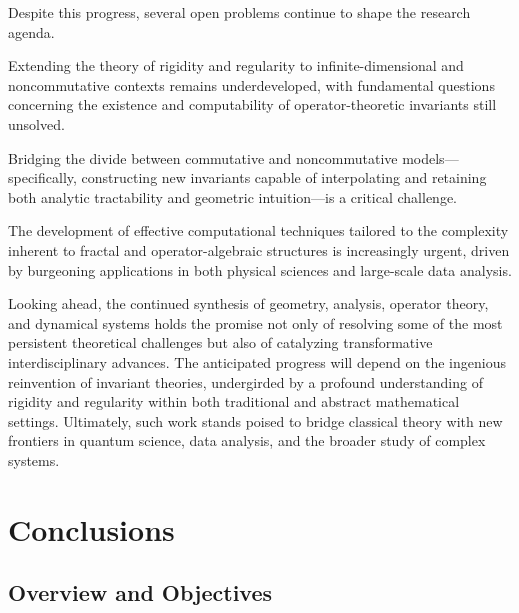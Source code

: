 \documentclass[sigconf]{acmart}
\begin{document}
\vspace{1em}
Despite this progress, several open problems continue to shape the research agenda.

Extending the theory of rigidity and regularity to infinite-dimensional and noncommutative contexts remains underdeveloped, with fundamental questions concerning the existence and computability of operator-theoretic invariants still unsolved.

Bridging the divide between commutative and noncommutative models—specifically, constructing new invariants capable of interpolating and retaining both analytic tractability and geometric intuition—is a critical challenge.

The development of effective computational techniques tailored to the complexity inherent to fractal and operator-algebraic structures is increasingly urgent, driven by burgeoning applications in both physical sciences and large-scale data analysis.

\vspace{1em}
Looking ahead, the continued synthesis of geometry, analysis, operator theory, and dynamical systems holds the promise not only of resolving some of the most persistent theoretical challenges but also of catalyzing transformative interdisciplinary advances. The anticipated progress will depend on the ingenious reinvention of invariant theories, undergirded by a profound understanding of rigidity and regularity within both traditional and abstract mathematical settings. Ultimately, such work stands poised to bridge classical theory with new frontiers in quantum science, data analysis, and the broader study of complex systems.

\section{Conclusions}

\subsection*{Overview and Objectives}
\end{document}
